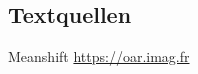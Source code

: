 \documentclass[10pt,utf8]{beamer}
\begin{document}
\subsection*{Textquellen}
\begin{frame}
	\begin{itemize}[]
	    \bibitem [0] {} Meanshift \url{https://oar.imag.fr}
    \end{itemize}
\end{frame}
\end{document}

